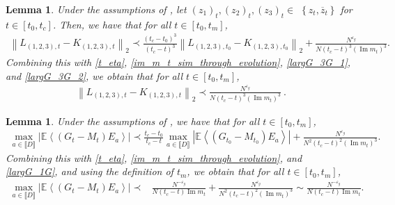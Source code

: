 \documentclass[10pt,reqno]{amsart}
\numberwithin{equation}{section}
\numberwithin{figure}{section}
\theoremstyle{plain} %
\newtheorem{lemma}[theorem]{Lemma}
\theoremstyle{definition} %
\renewcommand{\epsilon}{\varepsilon}
\renewcommand{\bar}{\overline}
\newcommand{\pa}[1]{\left({#1}\right)}
\newcommand{\qa}[1]{\left[{#1}\right]}
\DeclareMathOperator{\im}{\mathrm{Im}}
\numberwithin{equation}{section}
\begin{document}
\begin{lemma}\label{lem_flow_2}
    Under the assumptions of , let $\left(z_1\right)_t,\left(z_2\right)_t,\left(z_3\right)_t \in$ $\left\{z_t, \bar{z}_t\right\}$ for $t\in \qa{t_0,t_c}$. Then, we have that for all $t\in [t_0,t_m]$,
    \begin{equation}\label{flow_3G_res}
        \begin{aligned}
            \left\|L_{(1,2,3), t}-K_{(1,2,3), t}\right\|_2 \prec \frac{\left(t_c-t_0\right)^3}{\left(t_c-t\right)^3}\left\|L_{(1,2,3), t_0}-K_{(1,2,3), t_0}\right\|_2+\frac{N^{\epsilon_g}}{N\left(t_c-t\right)^3\left(\operatorname{Im} m_t\right)^3}.
        \end{aligned}
    \end{equation}
Combining this with \eqref{t_eta}, \eqref{im_m_t_sim_through_evolution}, \eqref{largG_3G_1}, and \eqref{largG_3G_2}, we obtain that for all $t\in\qa{t_0,t_m}$,
    \begin{equation}\label{flow_3G_res_2}
        \begin{aligned}
            \left\|L_{(1,2,3), t}-K_{(1,2,3), t}\right\|_2 \prec \frac{N^{\epsilon_g}}{N\left(t_c-t\right)^3\left(\operatorname{Im} m_t\right)^3} \ .
        \end{aligned}
    \end{equation}
\end{lemma}

\begin{lemma}\label{lem_flow_1.5}
    Under the assumptions of , we have that for all $t\in [t_0,t_m]$,
    \begin{equation}\label{flow_1G_res}
        \begin{aligned}
            \max _{a \in \llbracket D \rrbracket}\left|\mathbb{E}\left\langle\left(G_t-M_t\right) E_a\right\rangle\right| \prec \frac{t_c-t_0}{t_c-t} \max _{a \in \llbracket D \rrbracket}\left|\mathbb{E}\left\langle\left(G_{t_0}-M_{t_0}\right) E_a\right\rangle\right|+\frac{N^{\epsilon_g}}{N^2\left(t_c-t\right)^2\left(\operatorname{Im} m_t\right)^3}.
        \end{aligned}
    \end{equation}
Combining this with \eqref{t_eta}, \eqref{im_m_t_sim_through_evolution}, and \eqref{largG_1G}, and using the definition of $t_m$, we obtain that for all $t\in\qa{t_0,t_m}$,
    \begin{equation}\label{flow_1G_res_2}
        \begin{aligned}
            \max _{a \in \llbracket D \rrbracket}\left|\mathbb{E}\left\langle\left(G_t-M_t\right) E_a\right\rangle\right| \prec& \frac{N^{-\varepsilon_g}}{N\pa{t_c-t}\im m_t}+\frac{N^{\epsilon_g}}{N^2\left(t_c-t\right)^2\left(\operatorname{Im} m_t\right)^3}\sim \frac{N^{-\varepsilon_g}}{N\pa{t_c-t}\im m_t}.
        \end{aligned}
    \end{equation}
\end{lemma}
\end{document}
